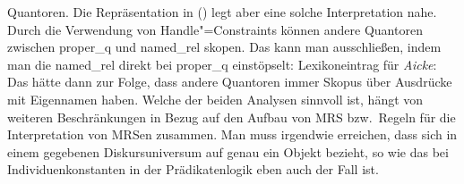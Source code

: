 Quantoren. Die Repräsentation in () legt aber eine solche Interpretation nahe. Durch
die Verwendung von Handle"=Constraints können andere Quantoren zwischen proper\_q und named\_rel
skopen. Das kann man ausschließen, indem man die named\_rel direkt bei proper\_q einstöpselt:
\eas
\label{le-Aicke-2}%
Lexikoneintrag für \emph{Aicke}:\\
\zs
Das hätte dann zur Folge, dass andere Quantoren immer Skopus über Ausdrücke mit Eigennamen
haben. Welche der beiden Analysen sinnvoll ist, hängt von weiteren Beschränkungen in Bezug auf den
Aufbau von MRS bzw.\ Regeln für die Interpretation von MRSen zusammen. Man muss irgendwie erreichen, dass  sich
in einem gegebenen Diskursuniversum auf genau ein Objekt bezieht, so wie das bei
Individuenkonstanten in der Prädikatenlogik eben auch der Fall ist.

